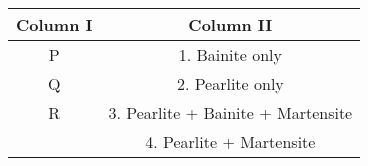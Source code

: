 \begin{tabular}{|c|c|}
\hline
\textbf{Column I} & \textbf{Column II}\\
\hline
P & 1. Bainite only\\
\hline
Q & 2. Pearlite only\\
\hline
R & 3. Pearlite + Bainite + Martensite\\
\hline
& 4. Pearlite + Martensite\\
\hline
\end{tabular}

